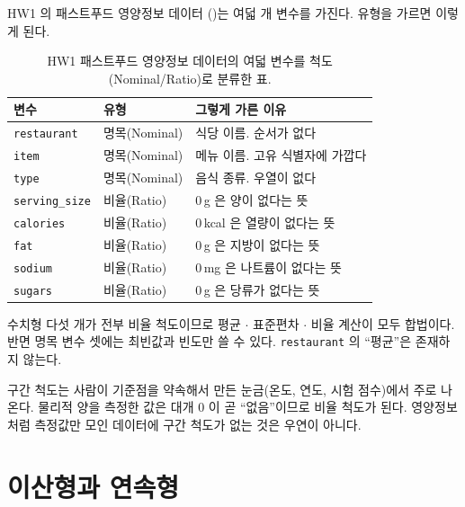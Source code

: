 \begin{example}[과제 데이터의 여덟 변수]
\label{ex:hw1-types}
HW1 의 패스트푸드 영양정보 데이터
()는 여덟 개 변수를 가진다. 유형을 가르면 이렇게 된다.

\begin{table}[H]\centering
\caption{HW1 패스트푸드 영양정보 데이터의 여덟 변수를 척도(Nominal/Ratio)로
분류한 표.}
\label{tab:attr-hw1-vars}
\begin{tabularx}{0.95\linewidth}{@{}l l X@{}}
\toprule
변수 & 유형 & 그렇게 가른 이유 \\
\midrule
\texttt{restaurant}   & 명목(Nominal) & 식당 이름. 순서가 없다 \\
\midrule
\texttt{item}         & 명목(Nominal) & 메뉴 이름. 고유 식별자에 가깝다 \\
\midrule
\texttt{type}         & 명목(Nominal) & 음식 종류. 우열이 없다 \\
\midrule
\texttt{serving\_size}& 비율(Ratio)   & 0\,g 은 양이 없다는 뜻 \\
\midrule
\texttt{calories}     & 비율(Ratio)   & 0\,kcal 은 열량이 없다는 뜻 \\
\midrule
\texttt{fat}          & 비율(Ratio)   & 0\,g 은 지방이 없다는 뜻 \\
\midrule
\texttt{sodium}       & 비율(Ratio)   & 0\,mg 은 나트륨이 없다는 뜻 \\
\midrule
\texttt{sugars}       & 비율(Ratio)   & 0\,g 은 당류가 없다는 뜻 \\
\bottomrule
\end{tabularx}
\end{table}

수치형 다섯 개가 전부 비율 척도이므로 평균 $\cdot$ 표준편차 $\cdot$ 비율 계산이
모두 합법이다. 반면 명목 변수 셋에는 최빈값과 빈도만 쓸 수 있다.
\texttt{restaurant} 의 ``평균''은 존재하지 않는다.
\end{example}

\begin{aside}
구간 척도는 사람이 기준점을 약속해서 만든 눈금(온도, 연도, 시험 점수)에서
주로 나온다. 물리적 양을 측정한 값은 대개 0 이 곧 ``없음''이므로 비율 척도가
된다. 영양정보처럼 측정값만 모인 데이터에 구간 척도가 없는 것은 우연이 아니다.
\end{aside}

\section{이산형과 연속형}
\label{sec:attr-discrete}

